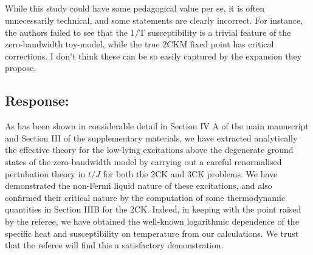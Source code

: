 \documentclass{article}
\newcommand{\response}[1]{{\color{blue}\subsection*{Response:}{#1}}}
\newcommand{\point}[1]{\subsection{}{#1}}
\begin{document}
\point{While this study could have some pedagogical value per se, it is  often unnecessarily technical, and some statements are clearly incorrect. For instance, the authors failed to see that the 1/T susceptibility is a trivial feature of the zero-bandwidth toy-model, while the true 2CKM fixed point has critical corrections. I don't think these can be so easily captured by the expansion they propose.}

\response{As has been shown in considerable detail in Section IV A of the  main manuscript and Section III of the supplementary materials, we have  extracted analytically the effective theory for the low-lying excitations  above the degenerate ground states of the zero-bandwidth model by carrying  out a careful renormalised pertubation theory in $t/J$ for both the 2CK and  3CK problems. We have demonstrated the non-Fermi liquid nature of these  excitations, and also confirmed their critical nature by the computation of  some thermodynamic quantities in Section IIIB for the 2CK. Indeed, in keeping with the point raised by the referee, we have  obtained the well-known logarithmic dependence of the specific heat and  susceptibility on temperature from our calculations. We trust that the referee will find this a satisfactory demonstration.}





\end{document}

